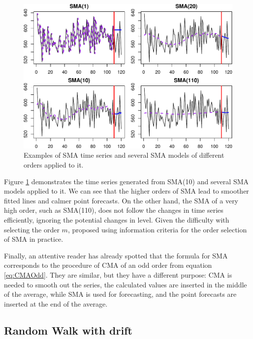 \documentclass[
]{book}
\theoremstyle{definition}
\theoremstyle{definition}
\theoremstyle{definition}
\theoremstyle{definition}
\theoremstyle{remark}
\begin{document}
\begin{figure}
\centering
\includegraphics{Svetunkov--2022----ADAM_files/figure-latex/SMAExample-1.pdf}
\caption{\label{fig:SMAExample}Examples of SMA time series and several SMA models of different orders applied to it.}
\end{figure}

Figure \ref{fig:SMAExample} demonstrates the time series generated from SMA(10) and several SMA models applied to it. We can see that the higher orders of SMA lead to smoother fitted lines and calmer point forecasts. On the other hand, the SMA of a very high order, such as SMA(110), does not follow the changes in time series efficiently, ignoring the potential changes in level. Given the difficulty with selecting the order \(m\), \citet{Svetunkov2017} proposed using information criteria for the order selection of SMA in practice.

Finally, an attentive reader has already spotted that the formula for SMA corresponds to the procedure of CMA of an odd order from equation \eqref{eq:CMAOdd}. They are similar, but they have a different purpose: CMA is needed to smooth out the series, the calculated values are inserted in the middle of the average, while SMA is used for forecasting, and the point forecasts are inserted at the end of the average.

\hypertarget{RWWithDrift}{%
\subsection{Random Walk with drift}\label{RWWithDrift}}
\end{document}
